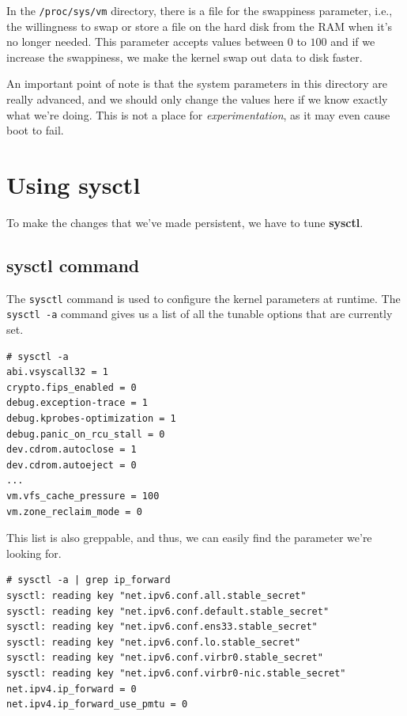 In the \verb|/proc/sys/vm| directory, there is a file for the swappiness parameter, i.e., the willingness to swap or store a file on the hard disk from the RAM when it's no longer needed. This parameter accepts values between $0$ to $100$ and if we increase the swappiness, we make the kernel swap out data to disk faster. 

An important point of note is that the system parameters in this directory are really advanced, and we should only change the values here if we know exactly what we're doing. This is not a place for \textit{experimentation}, as it may even cause boot to fail.

\section{Using sysctl}
To make the changes that we've made persistent, we have to tune \textbf{sysctl}. 

\subsection{sysctl command}
The \verb|sysctl| command is used to configure the kernel parameters at runtime. The \verb|sysctl -a| command gives us a list of all the tunable options that are currently set. 

\vspace{-15pt}
\begin{verbatim}
# sysctl -a
abi.vsyscall32 = 1
crypto.fips_enabled = 0
debug.exception-trace = 1
debug.kprobes-optimization = 1
debug.panic_on_rcu_stall = 0
dev.cdrom.autoclose = 1
dev.cdrom.autoeject = 0
...
vm.vfs_cache_pressure = 100
vm.zone_reclaim_mode = 0
\end{verbatim}
\vspace{-10pt}

\noindent
This list is also greppable, and thus, we can easily find the parameter we're looking for. 

\vspace{-15pt}
\begin{verbatim}
# sysctl -a | grep ip_forward
sysctl: reading key "net.ipv6.conf.all.stable_secret"
sysctl: reading key "net.ipv6.conf.default.stable_secret"
sysctl: reading key "net.ipv6.conf.ens33.stable_secret"
sysctl: reading key "net.ipv6.conf.lo.stable_secret"
sysctl: reading key "net.ipv6.conf.virbr0.stable_secret"
sysctl: reading key "net.ipv6.conf.virbr0-nic.stable_secret"
net.ipv4.ip_forward = 0
net.ipv4.ip_forward_use_pmtu = 0
\end{verbatim}
\vspace{-10pt}

